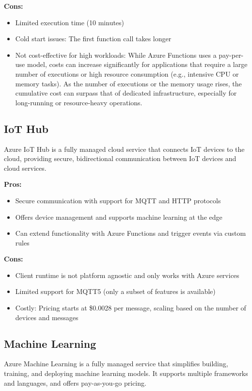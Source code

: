 \textbf{Cons:}
\begin{itemize}
    \item Limited execution time (10 minutes)
    \item Cold start issues: The first function call takes longer
    \item Not cost-effective for high workloads: While Azure Functions uses a pay-per-use model, costs can increase significantly for applications that require a large number of executions or high resource consumption (e.g., intensive CPU or memory tasks). As the number of executions or the memory usage rises, the cumulative cost can surpass that of dedicated infrastructure, especially for long-running or resource-heavy operations.
\end{itemize}

\subsection*{IoT Hub}
\label{azure:iot-hub}
Azure IoT Hub is a fully managed cloud service that connects IoT devices to the cloud, providing secure, bidirectional communication between IoT devices and cloud services.

\textbf{Pros:}
\begin{itemize}
    \item Secure communication with support for MQTT and HTTP protocols
    \item Offers device management and supports machine learning at the edge
    \item Can extend functionality with Azure Functions and trigger events via custom rules
\end{itemize}

\textbf{Cons:}
\begin{itemize}
    \item Client runtime is not platform agnostic and only works with Azure services
    \item Limited support for MQTT5 (only a subset of features is available)
    \item Costly: Pricing starts at \$0.0028 per message, scaling based on the number of devices and messages
\end{itemize}

\subsection*{Machine Learning}
\label{azure:machine-learning}
Azure Machine Learning is a fully managed service that simplifies building, training, and deploying machine learning models. It supports multiple frameworks and languages, and offers pay-as-you-go pricing.

